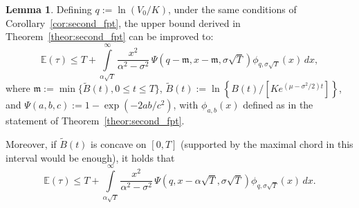 \documentclass[12pt]{article}
\theoremstyle{definition}
\newtheorem{lemma}{Lemma}[theorem]
\begin{document}
\begin{lemma}\label{lem:second_fpt}
Defining $q:=\ln\left(V_0/K\right)$, under the same conditions of Corollary~\ref{cor:second_fpt}, the upper bound derived in Theorem~\ref{theor:second_fpt} can be improved to:
\begin{equation}
    \nonumber
    \mathbb{E}(\tau) \le T + 
    \int\limits_{\alpha\sqrt{T}}^\infty \frac{x^2}{ \alpha^2 - \sigma^2} \,
    \Psi \! \left(q-\mathfrak{m},x-\mathfrak{m},\sigma\sqrt{T}\right)\phi_{q,\sigma\sqrt{T}}(x) \, dx,
\end{equation}
where $\mathfrak{m} := \min \{ \tilde{B}(t), 0 \le t \le T \}$, $\tilde{B}(t):=\ln\left\{B(t) \Big/\left[Ke^{(\mu-\sigma^2/2)t}\right]\right\}$, and $\Psi(a,b,c):=1-\exp\left(-2ab/c^2\right)$, with $\phi_{a,b}(x)$ defined as in the statement of Theorem~\ref{theor:second_fpt}.

Moreover, if $\tilde{B}(t)$ is concave on $[0,T]$ (supported by the maximal chord in this interval would be enough), it holds that
$$
\mathbb{E}(\tau) \le T + 
\int\limits_{\alpha\sqrt{T}}^\infty \frac{x^2}{ \alpha^2 - \sigma^2} \,
\Psi \! \left(q,x-\alpha\sqrt{T},\sigma\sqrt{T}\right)\phi_{q,\sigma\sqrt{T}}(x) \, dx.
$$
\end{lemma}
\end{document}
